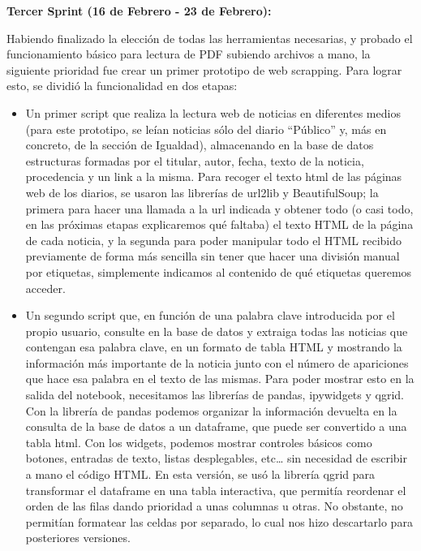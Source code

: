 

\textbf{Tercer Sprint (16 de Febrero - 23 de Febrero):}

Habiendo finalizado la elección de todas las herramientas necesarias, y probado el funcionamiento básico para lectura de PDF subiendo archivos a mano, la siguiente prioridad fue crear un primer prototipo de web scrapping.
Para lograr esto, se dividió la funcionalidad en dos etapas:
\begin{itemize}

\item Un primer script que realiza la lectura web de noticias en diferentes medios (para este prototipo, se leían noticias sólo del diario “Público” y, más en concreto, de la sección de Igualdad), almacenando en la base de datos estructuras formadas por el titular, autor, fecha, texto de la noticia, procedencia y un link a la misma.
Para recoger el texto html de las páginas web de los diarios, se usaron las librerías de url2lib y BeautifulSoup; la primera para hacer una llamada a la url indicada y obtener todo (o casi todo, en las próximas etapas explicaremos qué faltaba) el texto HTML de la página de cada noticia, y la segunda para poder manipular todo el HTML recibido previamente de forma más sencilla sin tener que hacer una división manual por etiquetas, simplemente indicamos al contenido de qué etiquetas queremos acceder.
 
\item Un segundo script que, en función de una palabra clave introducida por el propio usuario, consulte en la base de datos y extraiga todas las noticias que contengan esa palabra clave, en un formato de tabla HTML y mostrando la información más importante de la noticia junto con el número de apariciones que hace esa palabra en el texto de las mismas.
Para poder mostrar esto en la salida del notebook, necesitamos las librerías de pandas, ipywidgets y qgrid. Con la librería de pandas podemos organizar la información devuelta en la consulta de la base de datos a un dataframe, que puede ser convertido a una tabla html. Con los widgets, podemos mostrar controles básicos como botones, entradas de texto, listas desplegables, etc… sin necesidad de escribir a mano el código HTML. En esta versión, se usó la librería qgrid para transformar el dataframe en una tabla interactiva, que permitía reordenar el orden de las filas dando prioridad a unas columnas u otras. No obstante, no permitían formatear las celdas por separado, lo cual nos hizo descartarlo para posteriores versiones.

\end{itemize}

